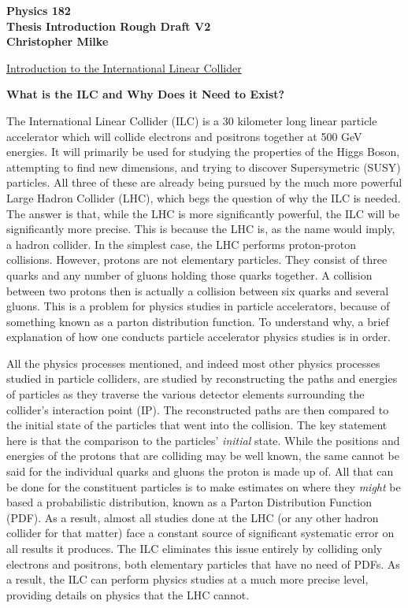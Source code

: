 \documentclass{article}
\begin{document}
    \begin{center}
        \bf{\large Physics 182 \\ Thesis Introduction Rough Draft V2 \\ Christopher Milke}
    \end{center}


    \vspace{10mm}
    \begin{center}
        \underline{ \large Introduction to the International Linear Collider }
    \end{center}
        \begin{center} \bf{What is the ILC and Why Does it Need to Exist?} \end{center}

        The International Linear Collider (ILC) is a 30 kilometer long linear particle accelerator which will collide electrons and positrons together at 500 GeV energies. It will primarily be used for studying the properties of the Higgs Boson, attempting to find new dimensions, and trying to discover Supersymetric (SUSY) particles. All three of these are already being pursued by the much more powerful Large Hadron Collider (LHC), which begs the question of why the ILC is needed. The answer is that, while the LHC is more significantly powerful, the ILC will be significantly more precise. This is because the LHC is, as the name would imply, a hadron collider. In the simplest case, the LHC performs proton-proton collisions. However, protons are not elementary particles. They consist of three quarks and any number of gluons holding those quarks together. A collision between two protons then is actually a collision between six quarks and several gluons. This is a problem for physics studies in particle accelerators, because of something known as a parton distribution function. To understand why, a brief explanation of how one conducts particle accelerator physics studies is in order.

        All the physics processes mentioned, and indeed most other physics processes studied in particle colliders, are studied by reconstructing the paths and energies of particles as they traverse the various detector elements surrounding the collider's interaction point (IP). The reconstructed paths are then compared to the initial state of the particles that went into the collision. The key statement here is that the comparison to the particles' \textit{initial} state. While the positions and energies of the protons that are colliding may be well known, the same cannot be said for the individual quarks and gluons the proton is made up of. All that can be done for the constituent particles is to make estimates on where they \textit{might} be based a probabilistic distribution, known as a Parton Distribution Function (PDF). As a result, almost all studies done at the LHC (or any other hadron collider for that matter) face a constant source of significant systematic error on all results it produces. The ILC eliminates this issue entirely by colliding only electrons and positrons, both elementary particles that have no need of PDFs. As a result, the ILC can perform physics studies at a much more precise level, providing details on physics that the LHC cannot.
\end{document}
